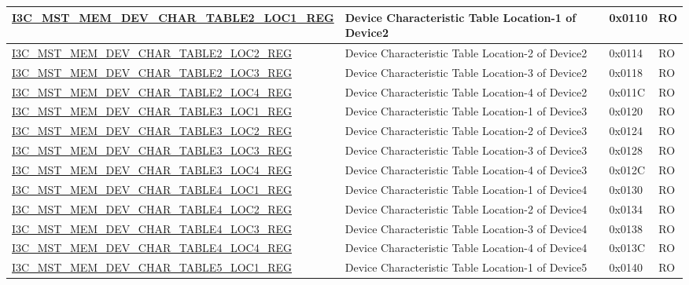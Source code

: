 \begin{longtable}{ | p{8cm} | p{5.5cm} | p{1.3cm} | p{1cm} | }
\hyperref[regdesc:I3CMSTMEMDEVCHARTABLENLOCMREG]{I3C\_MST\_MEM\_DEV\_CHAR\_TABLE2\_LOC1\_REG} & Device Characteristic Table Location-1 of Device2 & 0x0110 & RO \\ \hline
\hyperref[regdesc:I3CMSTMEMDEVCHARTABLENLOCMREG]{I3C\_MST\_MEM\_DEV\_CHAR\_TABLE2\_LOC2\_REG} & Device Characteristic Table Location-2 of Device2 & 0x0114 & RO \\ \hline
\hyperref[regdesc:I3CMSTMEMDEVCHARTABLENLOCMREG]{I3C\_MST\_MEM\_DEV\_CHAR\_TABLE2\_LOC3\_REG} & Device Characteristic Table Location-3 of Device2 & 0x0118 & RO \\ \hline
\hyperref[regdesc:I3CMSTMEMDEVCHARTABLENLOCMREG]{I3C\_MST\_MEM\_DEV\_CHAR\_TABLE2\_LOC4\_REG} & Device Characteristic Table Location-4 of Device2 & 0x011C & RO \\ \hline
\hyperref[regdesc:I3CMSTMEMDEVCHARTABLENLOCMREG]{I3C\_MST\_MEM\_DEV\_CHAR\_TABLE3\_LOC1\_REG} & Device Characteristic Table Location-1 of Device3 & 0x0120 & RO \\ \hline
\hyperref[regdesc:I3CMSTMEMDEVCHARTABLENLOCMREG]{I3C\_MST\_MEM\_DEV\_CHAR\_TABLE3\_LOC2\_REG} & Device Characteristic Table Location-2 of Device3 & 0x0124 & RO \\ \hline
\hyperref[regdesc:I3CMSTMEMDEVCHARTABLENLOCMREG]{I3C\_MST\_MEM\_DEV\_CHAR\_TABLE3\_LOC3\_REG} & Device Characteristic Table Location-3 of Device3 & 0x0128 & RO \\ \hline
\hyperref[regdesc:I3CMSTMEMDEVCHARTABLENLOCMREG]{I3C\_MST\_MEM\_DEV\_CHAR\_TABLE3\_LOC4\_REG} & Device Characteristic Table Location-4 of Device3 & 0x012C & RO \\ \hline
\hyperref[regdesc:I3CMSTMEMDEVCHARTABLENLOCMREG]{I3C\_MST\_MEM\_DEV\_CHAR\_TABLE4\_LOC1\_REG} & Device Characteristic Table Location-1 of Device4 & 0x0130 & RO \\ \hline
\hyperref[regdesc:I3CMSTMEMDEVCHARTABLENLOCMREG]{I3C\_MST\_MEM\_DEV\_CHAR\_TABLE4\_LOC2\_REG} & Device Characteristic Table Location-2 of Device4 & 0x0134 & RO \\ \hline
\hyperref[regdesc:I3CMSTMEMDEVCHARTABLENLOCMREG]{I3C\_MST\_MEM\_DEV\_CHAR\_TABLE4\_LOC3\_REG} & Device Characteristic Table Location-3 of Device4 & 0x0138 & RO \\ \hline
\hyperref[regdesc:I3CMSTMEMDEVCHARTABLENLOCMREG]{I3C\_MST\_MEM\_DEV\_CHAR\_TABLE4\_LOC4\_REG} & Device Characteristic Table Location-4 of Device4 & 0x013C & RO \\ \hline
\hyperref[regdesc:I3CMSTMEMDEVCHARTABLENLOCMREG]{I3C\_MST\_MEM\_DEV\_CHAR\_TABLE5\_LOC1\_REG} & Device Characteristic Table Location-1 of Device5 & 0x0140 & RO \\ \hline

\end{longtable}
